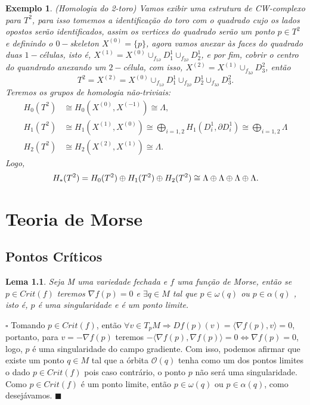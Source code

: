 \documentclass[12pt]{book}
\newtheorem{lema}[teorema]{Lema}
\newtheorem{exemplo}[teorema]{Exemplo}
\newenvironment{prova}[1]{$\square$ #1}{\hfill$\blacksquare$}
\newcommand{\celula}[2]{D^{#1}_{#2}}
\newcommand{\homologia}[2]{H_{#1}(#2)}
\newcommand{\homologiarelcel}[3]{H_{#1}(D^{#2}_{#3}, \partial D^{#2}_{#3})}
\newcommand{\homologiarelskele}[3]{H_{#1}(X^{(#2)}, X^{(#3)})}
\newcommand{\produtointerno}[2]{\langle #1, #2 \rangle}
\newcommand{\somadir}[1]{\bigoplus \limits_{#1}}
\newcommand{\skeleton}[1]{X^{(#1)}}
\begin{document}
	\begin{exemplo}
		(Homologia do 2-toro) Vamos exibir uma estrutura de CW-complexo para $T^{2}$, para isso tomemos a identificação do toro com o quadrado cujo os lados opostos serão identificados, assim os vertices do quadrado serão um ponto $p \in T^{2}$ e definindo o $0-$skeleton $\skeleton{0} = \{p\}$, agora vamos anexar às faces do quadrado duas $1-$células, isto é, $\skeleton{1} = \skeleton{0}\cup_{f_{1\partial}}\celula{1}{1}\cup_{f_{2\partial}}\celula{1}{2}$, e por fim, cobrir o centro do quandrado anexando um $2-$célula, com isso, $\skeleton{2} = \skeleton{1}\cup_{f_{3\partial}}\celula{2}{3}$, então
		$$
		T^{2} =\skeleton{2} = \skeleton{0}\cup_{f_{1\partial}}\celula{1}{1}\cup_{f_{2\partial}}\celula{1}{2}\cup_{f_{3\partial}}\celula{2}{3}.
		$$
		Teremos os grupos de homologia não-triviais:
		$$
		\begin{aligned}
		\homologia{0}{T^{2}} &\cong \homologiarelskele{0}{0}{-1} \cong \Lambda,
		\\
		\homologia{1}{T^{2}} &\cong \homologiarelskele{1}{1}{0} \cong \somadir{i=1,2}\homologiarelcel{1}{1}{i} \cong \somadir{i=1,2}\Lambda
		\\
		\homologia{2}{T^{2}} &\cong \homologiarelskele{2}{2}{1} \cong \Lambda.
		\end{aligned}
		$$
		Logo,
		$$
		\\
		\homologia{*}{T^{2}} = \homologia{0}{T^{2}}\oplus\homologia{1}{T^{2}} \oplus\homologia{2}{T^{2}}\cong \Lambda\oplus\Lambda\oplus\Lambda\oplus\Lambda.
		$$
	\end{exemplo}	
	
	\chapter{Teoria de Morse}
	\section{Pontos Críticos}
	
	\begin{lema}
		Seja M uma variedade fechada e $f$ uma função de Morse, então se $p \in Crit(f)$ teremos $\nabla f(p)=0$ e $\exists q \in M$ tal que $p \in \omega(q)$ ou $p \in \alpha(q)$ , isto é, $p$ é uma singularidade e é um ponto limite.
	\end{lema}
	\begin{prova}
		Tomando $p \in Crit(f)$, então $\forall v \in T_{p}M \Rightarrow Df(p)(v) = \produtointerno{\nabla f(p)}{v} = 0$, portanto, para $v = -\nabla f(p)$ teremos $-\produtointerno{\nabla f(p)}{\nabla f(p)} = 0 \iff \nabla f(p) = 0$, logo, $p$ é uma singularidade do campo gradiente. Com isso, podemos afirmar que existe um ponto $q \in M$ tal que a órbita $\mathcal{O}(q)$ tenha como um dos pontos limites o dado $p \in Crit(f)$ pois caso contrário, o ponto $p$ não será uma singularidade. Como $p \in Crit(f)$ é um ponto limite, então $p \in \omega(q)$ ou $p \in \alpha(q)$, como desejávamos.
	\end{prova}
	
\end{document}
